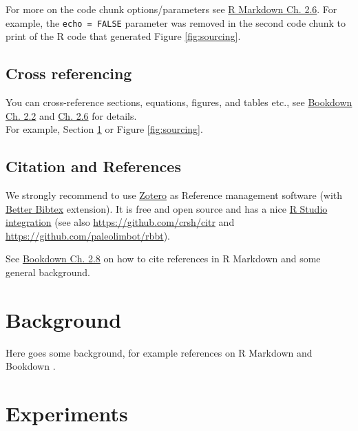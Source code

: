 \documentclass[
]{scrartcl}
\begin{document}
For more on the code chunk options/parameters see \href{https://bookdown.org/yihui/rmarkdown/r-code.html}{R Markdown Ch. 2.6}.
For example, the \texttt{echo\ =\ FALSE} parameter was removed in the second code chunk to print of the R code that
generated Figure \ref{fig:sourcing}.

\hypertarget{cross-referencing}{%
\subsection{Cross referencing}\label{cross-referencing}}

You can cross-reference sections, equations, figures, and tables etc., see \href{https://bookdown.org/yihui/bookdown/markdown-extensions-by-bookdown.html}{Bookdown Ch. 2.2} and \href{https://bookdown.org/yihui/bookdown/cross-references.html}{Ch. 2.6} for details.\\
For example, Section \ref{sec:background} or Figure \ref{fig:sourcing}.

\hypertarget{citation-and-references}{%
\subsection{Citation and References}\label{citation-and-references}}

We strongly recommend to use \href{https://www.zotero.org/}{Zotero} as Reference management software (with \href{https://retorque.re/zotero-better-bibtex/}{Better Bibtex} extension). It is free and open source and has a nice \href{https://rstudio.github.io/visual-markdown-editing/citations.html}{R Studio integration} (see also \url{https://github.com/crsh/citr} and \url{https://github.com/paleolimbot/rbbt}).

See \href{https://bookdown.org/yihui/bookdown/citations.html}{Bookdown Ch. 2.8} on how to cite references in R Markdown and
some general background.

\hypertarget{sec:background}{%
\section{Background}\label{sec:background}}

Here goes some background, for example references on R Markdown \citep{xie2018rmd} and Bookdown \citep{xie2016bookdown}.

\hypertarget{sec:experiments}{%
\section{Experiments}\label{sec:experiments}}
\end{document}
